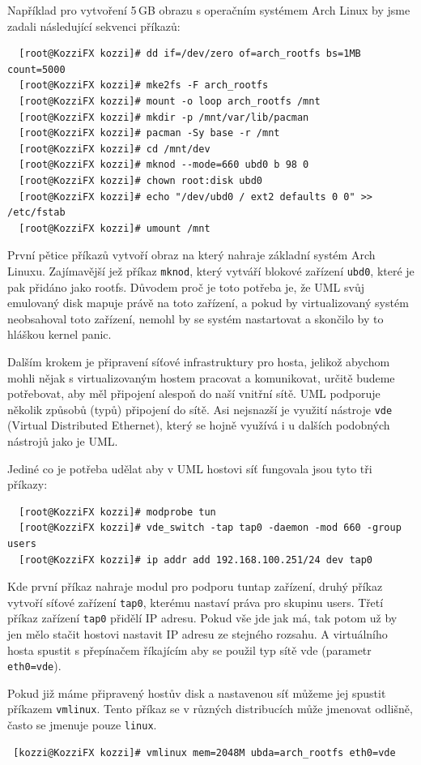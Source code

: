 Například pro vytvoření 5\,GB obrazu s operačním systémem Arch Linux by jsme zadali následující sekvenci příkazů:
\begin{verbatim}
  [root@KozziFX kozzi]# dd if=/dev/zero of=arch_rootfs bs=1MB count=5000
  [root@KozziFX kozzi]# mke2fs -F arch_rootfs
  [root@KozziFX kozzi]# mount -o loop arch_rootfs /mnt
  [root@KozziFX kozzi]# mkdir -p /mnt/var/lib/pacman
  [root@KozziFX kozzi]# pacman -Sy base -r /mnt
  [root@KozziFX kozzi]# cd /mnt/dev
  [root@KozziFX kozzi]# mknod --mode=660 ubd0 b 98 0
  [root@KozziFX kozzi]# chown root:disk ubd0
  [root@KozziFX kozzi]# echo "/dev/ubd0 / ext2 defaults 0 0" >> /etc/fstab
  [root@KozziFX kozzi]# umount /mnt
\end{verbatim}
První pětice příkazů vytvoří obraz na který nahraje základní systém Arch Linuxu. Zajímavější jež příkaz \texttt{mknod}, který vytváří blokové zařízení \texttt{ubd0}, které je pak přidáno jako rootfs. Důvodem proč je toto potřeba je, že UML svůj emulovaný disk mapuje právě na toto zařízení, a pokud by virtualizovaný systém neobsahoval toto zařízení, nemohl by se systém nastartovat a skončilo by to hláškou kernel panic.

Dalším krokem je připravení síťové infrastruktury pro hosta, jelikož abychom mohli nějak s virtualizovaným hostem pracovat a komunikovat, určitě budeme potřebovat, aby měl připojení alespoň do naší vnitřní sítě. UML podporuje několik způsobů (typů) připojení do sítě. Asi nejsnazší je využití nástroje \texttt{vde} (Virtual Distributed Ethernet), který se hojně využívá i u dalších podobných nástrojů jako je UML.

Jediné co je potřeba udělat aby v UML hostovi síť fungovala jsou tyto tři příkazy:
\begin{verbatim}
  [root@KozziFX kozzi]# modprobe tun
  [root@KozziFX kozzi]# vde_switch -tap tap0 -daemon -mod 660 -group users
  [root@KozziFX kozzi]# ip addr add 192.168.100.251/24 dev tap0
\end{verbatim} 

Kde první příkaz nahraje modul pro podporu tuntap zařízení, druhý příkaz vytvoří síťové zařízení \texttt{tap0}, kterému nastaví práva pro skupinu users. Třetí příkaz zařízení \texttt{tap0} přidělí IP adresu. Pokud vše jde jak má, tak potom už by jen mělo stačit hostovi nastavit IP adresu ze stejného rozsahu. A virtuálního hosta spustit s přepínačem říkajícím aby se použil typ sítě vde (parametr \texttt{eth0=vde}).

Pokud již máme připravený hostův disk a nastavenou síť můžeme jej spustit příkazem \texttt{vmlinux}. Tento příkaz se v různých distribucích může jmenovat odlišně, často se jmenuje pouze \texttt{linux}.
\begin{verbatim}
 [kozzi@KozziFX kozzi]# vmlinux mem=2048M ubda=arch_rootfs eth0=vde
\end{verbatim}
